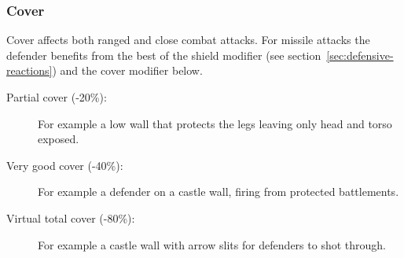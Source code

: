 \subsubsection{Cover}
Cover affects both ranged and close combat attacks. For missile attacks the defender benefits from the best of the shield modifier (see section~\ref{sec:defensive-reactions}) and the cover modifier below.

\begin{description}
	\item[Partial cover (-20\%):] For example a low wall that protects the legs leaving only head and torso exposed.
	\item[Very good cover (-40\%):] For example a defender on a castle wall, firing from protected battlements.
	\item[Virtual total cover (-80\%):] For example a castle wall with arrow slits for defenders to shot through.
\end{description}


